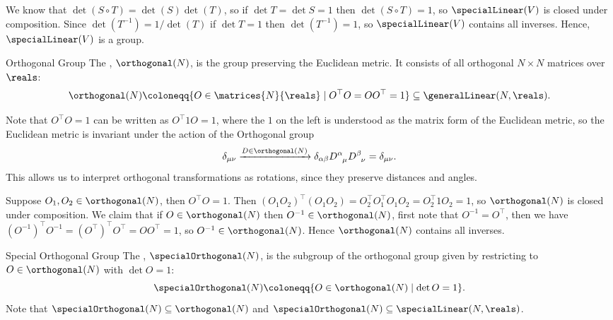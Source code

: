 \documentclass[fleqn]{NotesClass}
\newcommand{\subgroup}{\subseteq}
\newcommand{\ident}{1}
\newcommand{\trans}{\top}
\begin{document}
    We know that \(\det(S \circ T) = \det(S) \det(T)\), so if \(\det T = \det S = 1\) then \(\det(S \circ T) = 1\), so \(\specialLinear(V)\) is closed under composition.
    Since \(\det(T^{-1}) = 1/\det(T)\) if \(\det T = 1\) then \(\det(T^{-1}) = 1\), so \(\specialLinear(V)\) contains all inverses.
    Hence, \(\specialLinear(V)\) is a group.
    
    \begin{dfn}{Orthogonal Group}{}
        The , \(\orthogonal(N)\), is the group preserving the Euclidean metric.
        It consists of all orthogonal \(N \times N\) matrices over \(\reals\):
        \begin{equation}
            \orthogonal(N) \coloneqq \{O \in \matrices{N}{\reals} \mid O^\trans O = OO^\trans = \ident\} \subgroup \generalLinear(N, \reals).
        \end{equation}
    \end{dfn}
    
    Note that \(O^\trans O = \ident\) can be written as \(O^\trans \ident O = \ident\), where the \(\ident\) on the left is understood as the matrix form of the Euclidean metric, so the Euclidean metric is invariant under the action of the Orthogonal group
    \begin{equation}
        \delta_{\mu\nu} \xrightarrow{D \in \orthogonal(N)} \delta_{\alpha\beta} \tensor{D}{^\alpha_\mu}\tensor{D}{^\beta_\nu} = \delta_{\mu\nu}.
    \end{equation}
    This allows us to interpret orthogonal transformations as rotations, since they preserve distances and angles.
    
    Suppose \(O_1, O_2 \in \orthogonal(N)\), then \(O^\trans O = \ident\).
    Then \((O_1O_2)^{\trans}(O_1O_2) = O_2^\trans O_1^\trans O_1 O_2 = O_2^\trans \ident O_2 = \ident\), so \(\orthogonal(N)\) is closed under composition.
    We claim that if \(O \in \orthogonal(N)\) then \(O^{-1} \in \orthogonal(N)\), first note that \(O^{-1} = O^{\trans}\), then we have \((O^{-1})^\trans O^{-1} = (O^{\trans})^{\trans}O^{\trans} = OO^{\trans} = \ident\), so \(O^{-1} \in \orthogonal(N)\).
    Hence \(\orthogonal(N)\) contains all inverses.
    
    \begin{dfn}{Special Orthogonal Group}{}
        The , \(\specialOrthogonal(N)\), is the subgroup of the orthogonal group given by restricting to \(O \in \orthogonal(N)\) with \(\det O = 1\):
        \begin{equation}
            \specialOrthogonal(N) \coloneqq \{O \in \orthogonal(N) \mid \det O = 1\}.
        \end{equation}
        Note that \(\specialOrthogonal(N) \subgroup \orthogonal(N)\) and \(\specialOrthogonal(N) \subgroup \specialLinear(N, \reals)\).
    \end{dfn}
    
\end{document}
